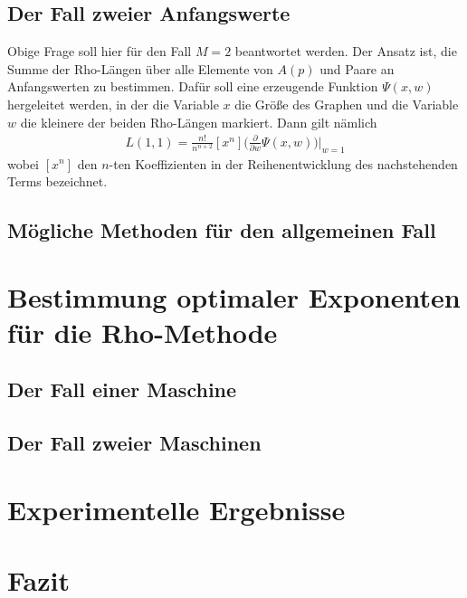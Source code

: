 \documentclass[a4paper, 10pt, ngerman]{article}
\begin{document}
\subsection{Der Fall zweier Anfangswerte}

Obige Frage soll hier für den Fall $M = 2$ beantwortet werden. Der Ansatz ist, die Summe der Rho-Längen über alle Elemente von $A(p)$ und Paare an Anfangswerten zu bestimmen. Dafür soll eine erzeugende Funktion $\Psi(x, w)$ hergeleitet werden, in der die Variable $x$ die Größe des Graphen und die Variable $w$ die kleinere der beiden Rho-Längen markiert. Dann gilt nämlich
\begin{align*}
    L(1, 1) = \frac {n!}{n^{n + 2}} [x^n] \Bigg (\frac {\partial} {\partial w} \Psi(x, w) \Bigg ) \Bigg \vert_{w = 1}
\end{align*}
wobei $[x^n]$ den $n$-ten Koeffizienten in der Reihenentwicklung des nachstehenden Terms bezeichnet.

\subsection{Mögliche Methoden für den allgemeinen Fall}

\section{Bestimmung optimaler Exponenten für die Rho-Methode}

\subsection{Der Fall einer Maschine}

\subsection{Der Fall zweier Maschinen}

\section{Experimentelle Ergebnisse}\label{sec:ex}

\section{Fazit}

\printbibliography
\end{document}
